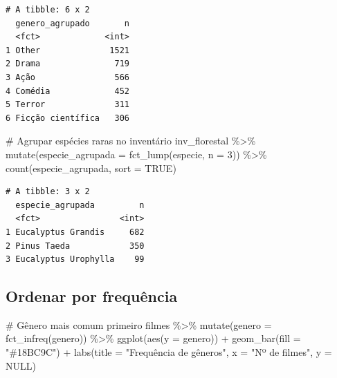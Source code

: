 \documentclass[
  letterpaper,
]{scrbook}
\newenvironment{Shaded}{\begin{snugshade}}{\end{snugshade}}
\newcommand{\AttributeTok}[1]{\textcolor[rgb]{0.40,0.45,0.13}{#1}}
\newcommand{\CommentTok}[1]{\textcolor[rgb]{0.37,0.37,0.37}{#1}}
\newcommand{\ConstantTok}[1]{\textcolor[rgb]{0.56,0.35,0.01}{#1}}
\newcommand{\DecValTok}[1]{\textcolor[rgb]{0.68,0.00,0.00}{#1}}
\newcommand{\FunctionTok}[1]{\textcolor[rgb]{0.28,0.35,0.67}{#1}}
\newcommand{\NormalTok}[1]{\textcolor[rgb]{0.00,0.23,0.31}{#1}}
\newcommand{\SpecialCharTok}[1]{\textcolor[rgb]{0.37,0.37,0.37}{#1}}
\newcommand{\StringTok}[1]{\textcolor[rgb]{0.13,0.47,0.30}{#1}}
\begin{document}
\begin{verbatim}
# A tibble: 6 x 2
  genero_agrupado       n
  <fct>             <int>
1 Other              1521
2 Drama               719
3 Ação                566
4 Comédia             452
5 Terror              311
6 Ficção científica   306
\end{verbatim}

\begin{Shaded}
\begin{Highlighting}[]
\CommentTok{\# Agrupar espécies raras no inventário}
\NormalTok{inv\_florestal }\SpecialCharTok{\%\textgreater{}\%}
  \FunctionTok{mutate}\NormalTok{(}\AttributeTok{especie\_agrupada =} \FunctionTok{fct\_lump}\NormalTok{(especie, }\AttributeTok{n =} \DecValTok{3}\NormalTok{)) }\SpecialCharTok{\%\textgreater{}\%}
  \FunctionTok{count}\NormalTok{(especie\_agrupada, }\AttributeTok{sort =} \ConstantTok{TRUE}\NormalTok{)}
\end{Highlighting}
\end{Shaded}

\begin{verbatim}
# A tibble: 3 x 2
  especie_agrupada         n
  <fct>                <int>
1 Eucalyptus Grandis     682
2 Pinus Taeda            350
3 Eucalyptus Urophylla    99
\end{verbatim}

\subsection{Ordenar por frequência}\label{ordenar-por-frequuxeancia}

\begin{Shaded}
\begin{Highlighting}[]
\CommentTok{\# Gênero mais comum primeiro}
\NormalTok{filmes }\SpecialCharTok{\%\textgreater{}\%}
  \FunctionTok{mutate}\NormalTok{(}\AttributeTok{genero =} \FunctionTok{fct\_infreq}\NormalTok{(genero)) }\SpecialCharTok{\%\textgreater{}\%}
  \FunctionTok{ggplot}\NormalTok{(}\FunctionTok{aes}\NormalTok{(}\AttributeTok{y =}\NormalTok{ genero)) }\SpecialCharTok{+}
  \FunctionTok{geom\_bar}\NormalTok{(}\AttributeTok{fill =} \StringTok{"\#18BC9C"}\NormalTok{) }\SpecialCharTok{+}
  \FunctionTok{labs}\NormalTok{(}\AttributeTok{title =} \StringTok{"Frequência de gêneros"}\NormalTok{, }\AttributeTok{x =} \StringTok{"Nº de filmes"}\NormalTok{, }\AttributeTok{y =} \ConstantTok{NULL}\NormalTok{)}
\end{Highlighting}
\end{Shaded}
\end{document}

